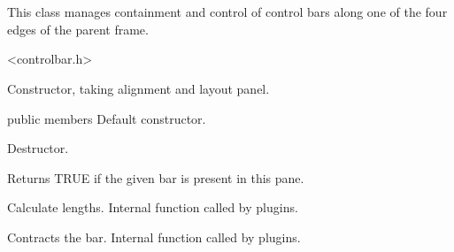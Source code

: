 %
%


\section{}\label{cbdockpane}


This class manages containment and control of control bars
along one of the four edges of the parent frame.




<controlbar.h>




\label{cbdockpanecbdockpane}


Constructor, taking alignment and layout panel.



public members Default constructor.


\label{cbdockpanedtor}


Destructor.


\label{cbdockpanebarpresent}


Returns TRUE if the given bar is present in this pane.


\label{cbdockpanecalclengthratios}


Calculate lengths.
Internal function called by plugins.


\label{cbdockpanecontractbar}


Contracts the bar.
Internal function called by plugins.


\label{cbdockpanedoinsertbar}

